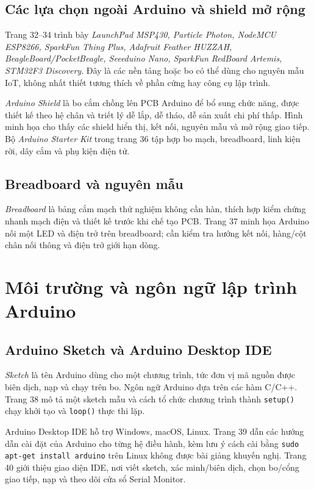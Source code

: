 \subsection{Các lựa chọn ngoài Arduino và shield mở rộng}
Trang 32--34 trình bày \emph{LaunchPad MSP430, Particle Photon, NodeMCU ESP8266, SparkFun Thing Plus, Adafruit Feather HUZZAH, BeagleBoard/PocketBeagle, Seeeduino Nano, SparkFun RedBoard Artemis, STM32F3 Discovery}. Đây là các nền tảng hoặc bo có thể dùng cho nguyên mẫu IoT, không nhất thiết tương thích về phần cứng hay công cụ lập trình.

\emph{Arduino Shield} là bo cắm chồng lên PCB Arduino để bổ sung chức năng, được thiết kế theo hệ chân và triết lý dễ lắp, dễ tháo, dễ sản xuất chi phí thấp. Hình minh họa cho thấy các shield hiển thị, kết nối, nguyên mẫu và mở rộng giao tiếp. Bộ \emph{Arduino Starter Kit} trong trang 36 tập hợp bo mạch, breadboard, linh kiện rời, dây cắm và phụ kiện điện tử.
\subsection{Breadboard và nguyên mẫu}
\emph{Breadboard} là bảng cắm mạch thử nghiệm không cần hàn, thích hợp kiểm chứng nhanh mạch điện và thiết kế trước khi chế tạo PCB. Trang 37 minh họa Arduino nối một LED và điện trở trên breadboard; cần kiểm tra hướng kết nối, hàng/cột chân nối thông và điện trở giới hạn dòng.
\section{Môi trường và ngôn ngữ lập trình Arduino}
\subsection{Arduino Sketch và Arduino Desktop IDE}
\emph{Sketch} là tên Arduino dùng cho một chương trình, tức đơn vị mã nguồn được biên dịch, nạp và chạy trên bo. Ngôn ngữ Arduino dựa trên các hàm C/C++. Trang 38 mô tả một sketch mẫu và cách tổ chức chương trình thành \texttt{setup()} chạy khởi tạo và \texttt{loop()} thực thi lặp.

Arduino Desktop IDE hỗ trợ Windows, macOS, Linux. Trang 39 dẫn các hướng dẫn cài đặt của Arduino cho từng hệ điều hành, kèm lưu ý cách cài bằng \texttt{sudo apt-get install arduino} trên Linux không được bài giảng khuyến nghị. Trang 40 giới thiệu giao diện IDE, nơi viết sketch, xác minh/biên dịch, chọn bo/cổng giao tiếp, nạp và theo dõi cửa sổ Serial Monitor.
